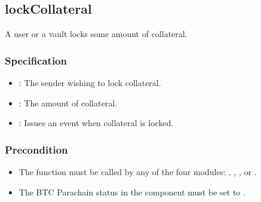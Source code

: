 \documentclass[a4paper,10pt,english]{sphinxmanual}
\begin{document}
\subsection{lockCollateral}
\label{\detokenize{spec/collateral:lockcollateral}}\label{\detokenize{spec/collateral:id1}}
A user or a vault locks some amount of collateral.


\subsubsection{Specification}
\label{\detokenize{spec/collateral:specification}}


\begin{itemize}
\item {} 
: The sender wishing to lock collateral.

\item {} 
: The amount of collateral.

\end{itemize}

\begin{itemize}
\item {} 
: Issues an event when collateral is locked.

\end{itemize}


\subsubsection{Precondition}
\label{\detokenize{spec/collateral:precondition}}\begin{itemize}
\item {} 
The function must be called by any of the four modules: {\hyperref[\detokenize{spec/issue:issue-protocol}]{}}, {\hyperref[\detokenize{spec/redeem:redeem-protocol}]{}}, {\hyperref[\detokenize{spec/replace:replace-protocol}]{}}, or {\hyperref[\detokenize{spec/vault-registry:vault-registry}]{}}.

\item {} 
The BTC Parachain status in the {\hyperref[\detokenize{spec/security:security}]{}} component must be set to .

\end{itemize}
\end{document}
